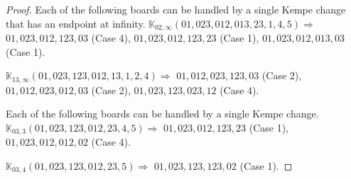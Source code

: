 \documentclass[12pt]{article}
\newcommand{\K}{\mathbb{K}}
\begin{document}
\begin{proof}
\bigskip

Each of the following boards can be handled by a single Kempe change that has an endpoint at infinity.
$\K_{02,\infty}(01,023,012,013,23,1, 4, 5)\Rightarrow $ $01,023,012,123,03$ (Case 4), $01,023,012,123,23$ (Case 1), $01,023,012,013,03$ (Case 1).

\bigskip

$\K_{13,\infty}(01,023,123,012,13,1, 2, 4)\Rightarrow $ $01,012,023,123,03$ (Case 2), $01,012,023,012,03$ (Case 2), $01,023,123,023,12$ (Case 4).

\bigskip

\bigskip

Each of the following boards can be handled by a single Kempe change.
$\K_{03,3}(01,023,123,012,23,4, 5)\Rightarrow $ $01,023,012,123,23$ (Case 1), $01,023,012,012,02$ (Case 4).

$\K_{03,4}(01,023,123,012,23,5)\Rightarrow $ $01,023,123,123,02$ (Case 1).


\bigskip

\end{proof}
\end{document}
